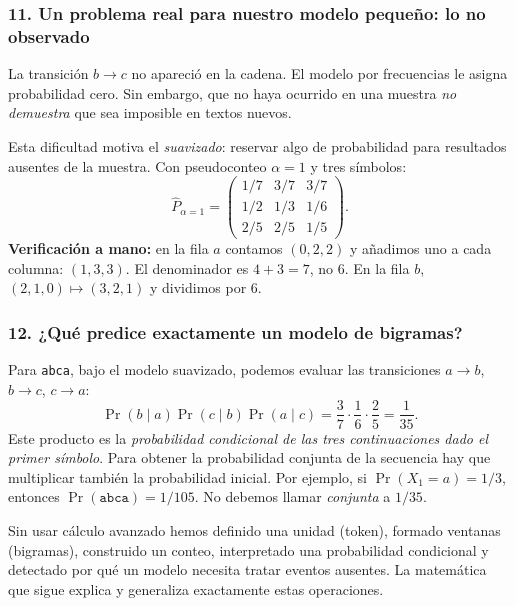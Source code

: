 \subsubsection*{11. Un problema real para nuestro modelo pequeño: lo no observado}
La transición $b\to c$ no apareció en la cadena. El modelo por frecuencias le asigna probabilidad cero. Sin embargo, que no haya ocurrido en una muestra \emph{no demuestra} que sea imposible en textos nuevos.
\begin{center}
\end{center}
Esta dificultad motiva el \emph{suavizado}: reservar algo de probabilidad para resultados ausentes de la muestra. Con pseudoconteo $\alpha=1$ y tres símbolos:
\[
\widehat P_{\alpha=1}=\begin{pmatrix}1/7&3/7&3/7\\1/2&1/3&1/6\\2/5&2/5&1/5\end{pmatrix}.
\]
\textbf{Verificación a mano:} en la fila $a$ contamos $(0,2,2)$ y añadimos uno a cada columna: $(1,3,3)$. El denominador es $4+3=7$, no $6$. En la fila $b$, $(2,1,0)\mapsto(3,2,1)$ y dividimos por $6$.

\subsubsection*{12. ¿Qué predice exactamente un modelo de bigramas?}
Para \texttt{abca}, bajo el modelo suavizado, podemos evaluar las transiciones $a\to b$, $b\to c$, $c\to a$:
\[
\Pr(b\mid a)\Pr(c\mid b)\Pr(a\mid c)=\frac37\cdot\frac16\cdot\frac25=\frac1{35}.
\]
Este producto es la \emph{probabilidad condicional de las tres continuaciones dado el primer símbolo}. Para obtener la probabilidad conjunta de la secuencia hay que multiplicar también la probabilidad inicial. Por ejemplo, si $\Pr(X_1=a)=1/3$, entonces $\Pr(\texttt{abca})=1/105$. No debemos llamar \emph{conjunta} a $1/35$.

\begin{idea}
Sin usar cálculo avanzado hemos definido una unidad (token), formado ventanas (bigramas), construido un conteo, interpretado una probabilidad condicional y detectado por qué un modelo necesita tratar eventos ausentes. La matemática que sigue explica y generaliza exactamente estas operaciones.
\end{idea}
\clearpage

